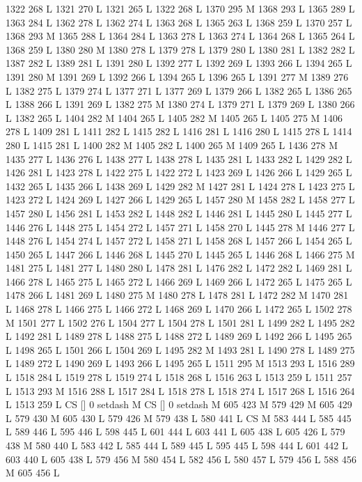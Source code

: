 {{{{{{{{{{{{{{{{{{1322 268 L
1321 270 L
1321 265 L
1322 268 L
1370 295 M 1368 293 L
1365 289 L
1363 284 L
1362 278 L
1362 274 L
1363 268 L
1365 263 L
1368 259 L
1370 257 L
1368 293 M 1365 288 L
1364 284 L
1363 278 L
1363 274 L
1364 268 L
1365 264 L
1368 259 L
1380 280 M 1380 278 L
1379 278 L
1379 280 L
1380 281 L
1382 282 L
1387 282 L
1389 281 L
1391 280 L
1392 277 L
1392 269 L
1393 266 L
1394 265 L
1391 280 M 1391 269 L
1392 266 L
1394 265 L
1396 265 L
1391 277 M 1389 276 L
1382 275 L
1379 274 L
1377 271 L
1377 269 L
1379 266 L
1382 265 L
1386 265 L
1388 266 L
1391 269 L
1382 275 M 1380 274 L
1379 271 L
1379 269 L
1380 266 L
1382 265 L
1404 282 M 1404 265 L
1405 282 M 1405 265 L
1405 275 M 1406 278 L
1409 281 L
1411 282 L
1415 282 L
1416 281 L
1416 280 L
1415 278 L
1414 280 L
1415 281 L
1400 282 M 1405 282 L
1400 265 M 1409 265 L
1436 278 M 1435 277 L
1436 276 L
1438 277 L
1438 278 L
1435 281 L
1433 282 L
1429 282 L
1426 281 L
1423 278 L
1422 275 L
1422 272 L
1423 269 L
1426 266 L
1429 265 L
1432 265 L
1435 266 L
1438 269 L
1429 282 M 1427 281 L
1424 278 L
1423 275 L
1423 272 L
1424 269 L
1427 266 L
1429 265 L
1457 280 M 1458 282 L
1458 277 L
1457 280 L
1456 281 L
1453 282 L
1448 282 L
1446 281 L
1445 280 L
1445 277 L
1446 276 L
1448 275 L
1454 272 L
1457 271 L
1458 270 L
1445 278 M 1446 277 L
1448 276 L
1454 274 L
1457 272 L
1458 271 L
1458 268 L
1457 266 L
1454 265 L
1450 265 L
1447 266 L
1446 268 L
1445 270 L
1445 265 L
1446 268 L
1466 275 M 1481 275 L
1481 277 L
1480 280 L
1478 281 L
1476 282 L
1472 282 L
1469 281 L
1466 278 L
1465 275 L
1465 272 L
1466 269 L
1469 266 L
1472 265 L
1475 265 L
1478 266 L
1481 269 L
1480 275 M 1480 278 L
1478 281 L
1472 282 M 1470 281 L
1468 278 L
1466 275 L
1466 272 L
1468 269 L
1470 266 L
1472 265 L
1502 278 M 1501 277 L
1502 276 L
1504 277 L
1504 278 L
1501 281 L
1499 282 L
1495 282 L
1492 281 L
1489 278 L
1488 275 L
1488 272 L
1489 269 L
1492 266 L
1495 265 L
1498 265 L
1501 266 L
1504 269 L
1495 282 M 1493 281 L
1490 278 L
1489 275 L
1489 272 L
1490 269 L
1493 266 L
1495 265 L
1511 295 M 1513 293 L
1516 289 L
1518 284 L
1519 278 L
1519 274 L
1518 268 L
1516 263 L
1513 259 L
1511 257 L
1513 293 M 1516 288 L
1517 284 L
1518 278 L
1518 274 L
1517 268 L
1516 264 L
1513 259 L
CS [] 0 setdash M
CS [] 0 setdash M
605 423 M 579 429 M 605 429 L
579 430 M 605 430 L
579 426 M 579 438 L
580 441 L
CS M
583 444 L
585 445 L
589 446 L
595 446 L
598 445 L
601 444 L
603 441 L
605 438 L
605 426 L
579 438 M 580 440 L
583 442 L
585 444 L
589 445 L
595 445 L
598 444 L
601 442 L
603 440 L
605 438 L
579 456 M 580 454 L
582 456 L
580 457 L
579 456 L
588 456 M 605 456 L
}}}}}}}}}}}}}}}}}}
